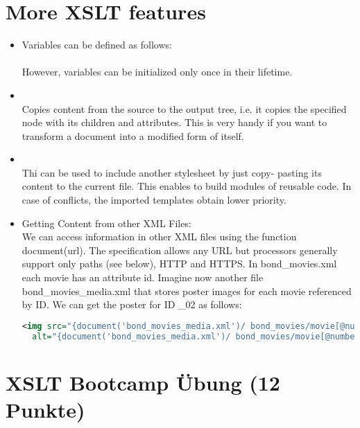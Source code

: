 \section{More XSLT features}
\begin{itemize}
  \item Variables can be defined as follows:\\
  \\
  However, variables can be initialized only once in their lifetime.
  \item {}\\ Copies content from the source to the output tree,
   i.e. it copies the specified node with its children and attributes.
   This is very handy if you want to transform a document into a modified form of itself.
   \item {}\\ Thi can be used to include another stylesheet by just copy- pasting its content to the current file.
    This enables to build modules of reusable code. In case of conflicts, the imported templates obtain lower priority.
    \item Getting Content from other XML Files:\\
    We can access information in other XML files using the function document(url). The specification allows any URL but processors
generally support only paths (see below), HTTP and HTTPS.
In bond\_movies.xml each movie has an attribute id. Imagine now another file bond\_movies\_media.xml that stores poster images for each movie referenced by ID.
We can get the poster for ID \_02 as follows:
\begin{lstlisting}[language=XML]
  <img src="{document('bond_movies_media.xml')/ bond_movies/movie[@number='_02']/poster/@href}"
  alt="{document('bond_movies_media.xml')/ bond_movies/movie[@number='_02']/title}"/>
\end{lstlisting}
\end{itemize}

\section{XSLT Bootcamp Übung (12 Punkte)}
